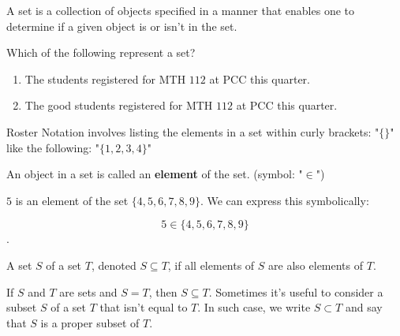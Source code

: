\label{les_1:sets_and_numbers}

\begin{definition}[Set]
  \label{def:set}

  A set is a collection of objects specified in a manner that enables one to
  determine if a given object is or isn't in the set.
\end{definition}

\begin{exc}
  \label{exc:which_of_the_following_represent_a_set}

  Which of the following represent a set?
  
  \begin{enumerate}
    \label{enum:sets_and_numbers_example}

    \item The students registered for MTH $112$ at PCC this quarter.
    \item The good students registered for MTH $112$ at PCC this quarter.
  \end{enumerate}
\end{exc}

\begin{notation}
  Roster Notation involves listing the elements in a set within curly brackets:
  "$\{ \}$" like the following: "$\{ 1, 2, 3, 4 \}$"
\end{notation}

\begin{definition}[Element]
  \label{def:element}

  An object in a set is called an \textbf{element} of the set. (symbol: "$\in$")
\end{definition}

\begin{example}
  \label{exm:element}

  $5$ is an element of the set $\{ 4, 5, 6, 7, 8, 9 \}$. We can express this
  symbolically:

  \[ 5 \in \{ 4, 5, 6, 7, 8, 9 \} \].
\end{example}

\begin{definition}[Subset]
  \label{def:subset}

  A set $S$ of a set $T$, denoted $S \subseteq T$, if all elements of $S$ are
  also elements of $T$.

  If $S$ and $T$ are sets and $S = T$, then $S \subseteq T$. Sometimes it's
  useful to consider a subset $S$ of a set $T$ that isn't equal to $T$. In such
  case, we write $S \subset T$ and say that $S$ is a proper subset of $T$.
\end{definition}

